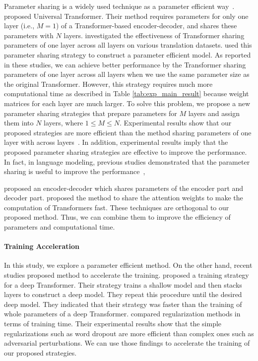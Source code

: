 \documentclass[11pt]{article}
\begin{document}
Parameter sharing is a widely used technique as a parameter efficient way~\cite{dehghani2019,Dabre_Fujita_2019,Xia_He_Tan_Tian_He_Qin_2019,lan2020}.
 proposed Universal Transformer.
Their method requires parameters for only one layer (i.e., $M=1$) of a Transformer-based encoder-decoder, and shares these parameters with $N$ layers.
 investigated the effectiveness of Transformer sharing parameters of one layer across all layers on various translation datasets.
 used this parameter sharing strategy to construct a parameter efficient model.
As reported in these studies, we can achieve better performance by the Transformer sharing parameters of one layer across all layers when we use the same parameter size as the original Transformer.
However, this strategy requires much more computational time as described in Table \ref{tab:exp_main_result} because weight matrices for each layer are much larger.
To solve this problem, we propose a new parameter sharing strategies that prepare parameters for $M$ layers and assign them into $N$ layers, where $1 \leq M \leq N$.
Experimental results show that our proposed strategies are more efficient than the method sharing parameters of one layer with across layers~\cite{dehghani2019,Dabre_Fujita_2019,lan2020}.
In addition, experimental results imply that the proposed parameter sharing strategies are effective to improve the performance.
In fact, in language modeling, previous studies demonstrated that the parameter sharing is useful to improve the performance~\cite{DBLP:journals/corr/MelisDB17,merityRegOpt,takase-etal-2018-direct},



 proposed an encoder-decoder which shares parameters of the encoder part and decoder part.
 proposed the method to share the attention weights to make the computation of Transformers fast.
These techniques are orthogonal to our proposed method.
Thus, we can combine them to improve the efficiency of parameters and computational time.


\paragraph{Training Acceleration}
In this study, we explore a parameter efficient method.
On the other hand, recent studies proposed method to accelerate the training.
 proposed a training strategy for a deep Transformer.
Their strategy trains a shallow model and then stacks layers to construct a deep model.
They repeat this procedure until the desired deep model.
They indicated that their strategy was faster than the training of whole parameters of a deep Transformer.
 compared regularization methods in terms of training time.
Their experimental results show that the simple regularizations such as word dropout are more efficient than complex ones such as adversarial perturbations.
We can use those findings to accelerate the training of our proposed strategies.
\end{document}
